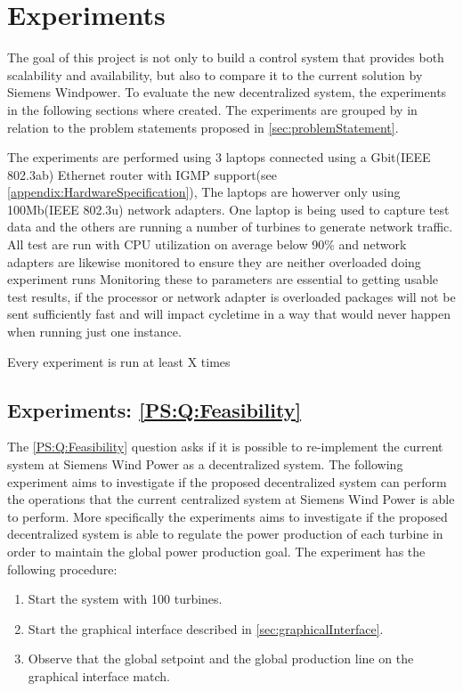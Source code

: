 
\chapter{Experiments}

\newcommand{\failingTurbineNumbers}{1, 5, 10, 30}
\newcommand{\testTurbineNumbers}{2, 21, 41, 61, 81 and 101}
\newcommand{\testCycletimeNumbers}{5ms, 10ms, 15ms, 20ms, 25ms and 30ms}
\newcommand{\experiemntRunTime}{2mins}

The goal of this project is not only to build a control system that provides both scalability and availability, but also to compare it to the current solution by Siemens Windpower. 
To evaluate the new decentralized system, the experiments in the following sections where created. 
The experiments are grouped by in relation to the problem statements proposed in \cref{sec:problemStatement}.

The experiments are performed using 3 laptops connected using a Gbit(IEEE 802.3ab) Ethernet router with IGMP support(see \cref{appendix:HardwareSpecification}), The laptops are howerver only using 100Mb(IEEE 802.3u) network adapters.
One laptop is being used to capture test data and the others are running a number of turbines to generate network traffic.
All test are run with CPU utilization on average below 90\% and network adapters are likewise monitored to ensure they are neither overloaded doing experiment runs
Monitoring these to parameters are essential to getting usable test results, if the processor or network adapter is overloaded packages will not be sent sufficiently fast and will impact cycletime in a way that would never happen when running just one instance.

Every experiment is run at least X  times 

\section{Experiments: \ref{PS:Q:Feasibility}}

The \ref{PS:Q:Feasibility} question asks if it is possible to re-implement the current system at Siemens Wind Power as a decentralized system. The following experiment aims to investigate if the proposed decentralized system can perform the operations that the current centralized system at Siemens Wind Power is able to perform. More specifically the experiments aims to investigate if the proposed decentralized system is able to regulate the power production of each turbine in order to maintain the global power production goal.
The experiment has the following procedure:
\begin{enumerate}
	\item Start the system with 100 turbines.
	\item Start the graphical interface described in \cref{sec:graphicalInterface}.
	\item Observe that the global setpoint and the global production line on the graphical interface match.
\end{enumerate}

